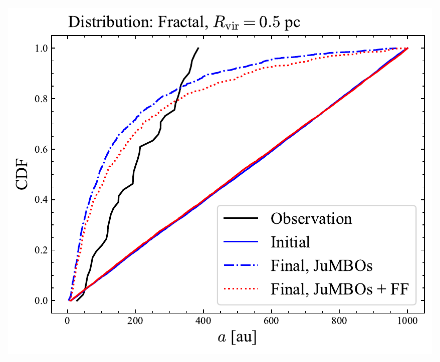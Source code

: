 \documentclass[aa]{aa}
\begin{document}
\begin{figure}
    \centering
        \includegraphics[width=.91\columnwidth]{figures/sem_axis_Fractal_FF.pdf}
        \caption{}
         \label{Fig:Fr_semimajor_axis}
\end{figure}
\end{document}
